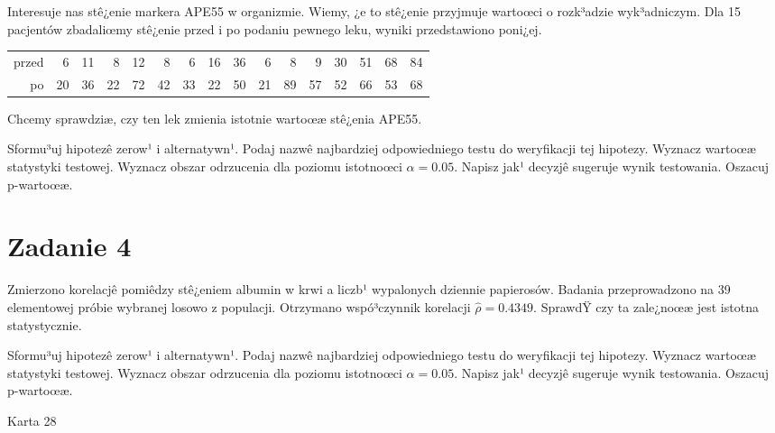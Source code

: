 \documentclass[a4paper,12pt]{article}
\begin{document}
  Interesuje nas stê¿enie markera APE55  w organizmie. 
  Wiemy, ¿e to stê¿enie przyjmuje wartoœci o rozk³adzie wyk³adniczym. 
  Dla 15 pacjentów zbadaliœmy stê¿enie przed i po podaniu pewnego leku, 
  wyniki przedstawiono poni¿ej.
  
  \vspace{0.5cm} 
  \noindent\begin{center} 
\begin{tabular}{rrrrrrrrrrrrrrrr}
  \hline
  \hline
przed & 6 & 11 & 8 & 12 & 8 & 6 & 16 & 36 & 6 & 8 & 9 & 30 & 51 & 68 & 84 \\
  po & 20 & 36 & 22 & 72 & 42 & 33 & 22 & 50 & 21 & 89 & 57 & 52 & 66 & 53 & 68 \\
   \hline
\end{tabular}
 
  \end{center} 
  \vspace{0.5cm}
  
  Chcemy sprawdziæ, czy ten lek zmienia istotnie wartoœæ stê¿enia APE55.
  
  Sformu³uj hipotezê zerow¹ i alternatywn¹. 
  Podaj nazwê najbardziej odpowiedniego testu do weryfikacji tej hipotezy. 
  Wyznacz wartoœæ statystyki testowej. 
  Wyznacz obszar odrzucenia dla poziomu istotnoœci $\alpha=0.05$. 
  Napisz jak¹ decyzjê sugeruje wynik testowania. Oszacuj p-wartoœæ. \vspace{1cm} 

  \section*{Zadanie 4}
     
     Zmierzono korelacjê pomiêdzy stê¿eniem albumin w krwi a liczb¹ wypalonych dziennie papierosów. 
     Badania przeprowadzono na 39 elementowej próbie wybranej losowo z populacji. 
     Otrzymano wspó³czynnik korelacji $\hat\rho = 0.4349 $. 
     SprawdŸ czy ta zale¿noœæ jest istotna statystycznie. 
     
     Sformu³uj hipotezê zerow¹ i alternatywn¹. 
     Podaj nazwê najbardziej odpowiedniego testu do weryfikacji tej hipotezy. 
     Wyznacz wartoœæ statystyki testowej. 
     Wyznacz obszar odrzucenia dla poziomu istotnoœci $\alpha=0.05$. 
     Napisz jak¹ decyzjê sugeruje wynik testowania. 
     Oszacuj p-wartoœæ. \vspace{1cm} 

  \clearpage  Karta  28  
\end{document}

